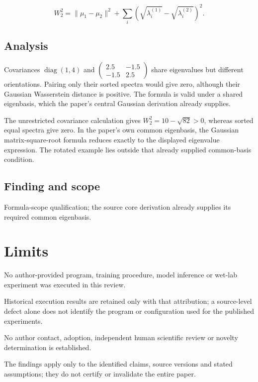 \documentclass[11pt]{article}
\begin{document}
\[W_2^2=\|\mu_1-\mu_2\|^2+ \sum_i\left(\sqrt{\lambda_i^{(1)}}-\sqrt{\lambda_i^{(2)}}\right)^2. \]

\subsection*{Analysis}

Covariances \(\operatorname{diag}(1,4)\) and \(\begin{pmatrix}2.5&-1.5\\-1.5&2.5\end{pmatrix}\) share eigenvalues but different orientations. Pairing only their sorted spectra would give zero, although their Gaussian Wasserstein distance is positive. The formula is valid under a shared eigenbasis, which the paper's central Gaussian derivation already supplies.

The unrestricted covariance calculation gives \(W_2^2=10-\sqrt{82}>0\), whereas sorted equal spectra give zero. In the paper’s own common eigenbasis, the Gaussian matrix-square-root formula reduces exactly to the displayed eigenvalue expression. The rotated example lies outside that already supplied common-basis condition.

\subsection*{Finding and scope}

Formula-scope qualification; the source core derivation already supplies its required common eigenbasis.

\section*{Limits}

No author-provided program, training procedure, model inference or wet-lab experiment was executed in this review.\par

Historical execution results are retained only with that attribution; a source-level defect alone does not identify the program or configuration used for the published experiments.\par

No author contact, adoption, independent human scientific review or novelty determination is established.\par

The findings apply only to the identified claims, source versions and stated assumptions; they do not certify or invalidate the entire paper.\par
\end{document}
